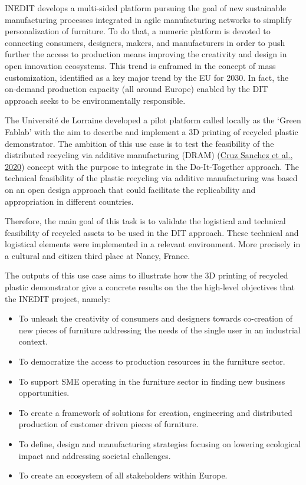 \documentclass[
  11pt,
]{article}
\providecommand{\tightlist}{%
  \setlength{\itemsep}{0pt}\setlength{\parskip}{0pt}}\usepackage{longtable,booktabs,array}
\begin{document}
INEDIT develops a multi-sided platform pursuing the goal of new
sustainable manufacturing processes integrated in agile manufacturing
networks to simplify personalization of furniture. To do that, a numeric
platform is devoted to connecting consumers, designers, makers, and
manufacturers in order to push further the access to production means
improving the creativity and design in open innovation ecosystems. This
trend is enframed in the concept of mass customization, identified as a
key major trend by the EU for 2030. In fact, the on-demand production
capacity (all around Europe) enabled by the DIT approach seeks to be
environmentally responsible.

The Université de Lorraine developed a pilot platform called locally as
the `Green Fablab' with the aim to describe and implement a 3D printing
of recycled plastic demonstrator. The ambition of this use case is to
test the feasibility of the distributed recycling via additive
manufacturing (DRAM) (\protect\hyperlink{ref-CruzSanchez2020}{Cruz
Sanchez et al., 2020}) concept with the purpose to integrate in the
Do-It-Together approach. The technical feasibility of the plastic
recycling via additive manufacturing was based on an open design
approach that could facilitate the replicability and appropriation in
different countries.

Therefore, the main goal of this task is to validate the logistical and
technical feasibility of recycled assets to be used in the DIT approach.
These technical and logistical elements were implemented in a relevant
environment. More precisely in a cultural and citizen third place at
Nancy, France.

The outputs of this use case aims to illustrate how the 3D printing of
recycled plastic demonstrator give a concrete results on the the
high-level objectives that the INEDIT project, namely:

\begin{itemize}
\tightlist
\item
  To unleash the creativity of consumers and designers towards
  co-creation of new pieces of furniture addressing the needs of the
  single user in an industrial context.
\item
  To democratize the access to production resources in the furniture
  sector.
\item
  To support SME operating in the furniture sector in finding new
  business opportunities.
\item
  To create a framework of solutions for creation, engineering and
  distributed production of customer driven pieces of furniture.
\item
  To define, design and manufacturing strategies focusing on lowering
  ecological impact and addressing societal challenges.
\item
  To create an ecosystem of all stakeholders within Europe.
\end{itemize}
\end{document}
